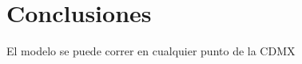 \chapter{Conclusiones}
\label{chap:conclusiones}

El modelo se puede correr en cualquier punto de la CDMX